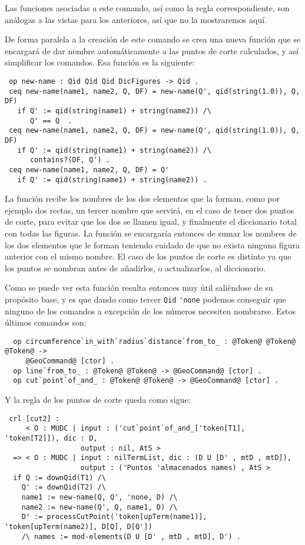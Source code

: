Las funciones asociadas a este comando, así como la regla correspondiente, son análogas a las vistas para los anteriores, así que no la mostraremos aquí. \par

De forma paralela a la creación de este comando se crea una nueva función que se encargará de dar nombre automáticamente a las puntos de corte calculados, y así simplificar los comandos. Esa función es la siguiente:

{\codesize
\begin{verbatim}
 op new-name : Qid Qid Qid DicFigures -> Qid .
 ceq new-name(name1, name2, Q, DF) = new-name(Q', qid(string(1.0)), Q, DF)
   if Q' := qid(string(name1) + string(name2)) /\
      Q' == Q  . 
 ceq new-name(name1, name2, Q, DF) = new-name(Q', qid(string(1.0)), Q, DF)
   if Q' := qid(string(name1) + string(name2)) /\
      contains?(DF, Q') .
 ceq new-name(name1, name2, Q, DF) = Q'
   if Q' := qid(string(name1) + string(name2)) .
\end{verbatim}
}

La función recibe los nombres de los dos elementos que la forman, como por ejemplo dos rectas, un tercer nombre que servirá, en el caso de tener dos puntos de corte, para evitar que los dos se llamen igual, y finalmente el diccionario total con todas las figuras. La función se encargaría entonces de sumar los nombres de los dos elementos que le forman teniendo cuidado de que no exista ninguna figura anterior con el mismo nombre. El caso de los puntos de corte es distinto ya que los puntos se nombran antes de añadirlos, o actualizarlos, al diccionario.\par

Como se puede ver esta función resulta entonces muy útil saliéndose de su propósito base, y es que dando como tercer \verb"Qid" \verb"'none" podemos conseguir que ninguno de los comandos a excepción de los números necesiten nombrarse. Estos últimos comandos son:

{\codesize
\begin{verbatim}
  op circumference`in_with`radius`distance`from_to_ : @Token@ @Token@ @Token@ ->  
     @GeoCommand@ [ctor] .
  op line`from_to_ : @Token@ @Token@ -> @GeoCommand@ [ctor] .
  op cut`point`of_and_ : @Token@ @Token@ -> @GeoCommand@ [ctor] .
\end{verbatim}
}

Y la regla de los puntos de corte queda como sigue:

{\codesize
\begin{verbatim}
 crl [cut2] :
     < O : MUDC | input : ('cut`point`of_and_['token[T1], 'token[T2]]), dic : D,
                  output : nil, AtS >
  => < O : MUDC | input : nilTermList, dic : (D U [D' , mtD , mtD]),
                  output : ('Puntos 'almacenados names) , AtS >
  if Q := downQid(T1) /\
    Q' := downQid(T2) /\
    name1 := new-name(Q, Q', 'none, D) /\
    name2 := new-name(Q', Q, name1, D) /\
    D' := processCutPoint('token[upTerm(name1)], 'token[upTerm(name2)], D[Q], D[Q']) 
    /\ names := mod-elements(D U [D' , mtD , mtD], D') .
\end{verbatim}
}

